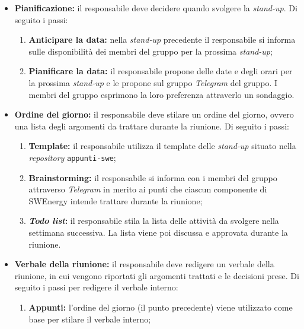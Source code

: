 \begin{itemize}

	\item \textbf{Pianificazione:} il responsabile deve decidere quando
	      svolgere la \textit{stand-up}. Di seguito i passi:
	      \begin{enumerate}
		      \item \textbf{Anticipare la data:} nella \textit{stand-up}
		            precedente il responsabile si informa sulle disponibilità
		            dei membri del gruppo per la prossima \textit{stand-up};

		      \item \textbf{Pianificare la data:} il responsabile propone delle
		            date e degli orari per la prossima \textit{stand-up} e le
		            propone sul gruppo \textit{Telegram} del gruppo. I membri
		            del gruppo esprimono la loro preferenza attraverlo un
		            sondaggio.
	      \end{enumerate}

	\item \textbf{Ordine del giorno:} il responsabile deve stilare un ordine del
	      giorno, ovvero una lista degli argomenti da trattare durante la
	      riunione. Di seguito i passi:
	      \begin{enumerate}
		      \item \textbf{Template:} il responsabile utilizza il template
		            delle \textit{stand-up} situato nella \textit{repository}
		            \texttt{appunti-swe};

		      \item \textbf{Brainstorming:} il responsabile si informa con i
		            membri del gruppo attraverso \textit{Telegram} in merito ai
		            punti che ciascun componente di SWEnergy intende trattare
		            durante la riunione;

		      \item \textbf{\textit{Todo list}:} il responsabile stila la lista
		            delle attività da svolgere nella settimana successiva. La
		            lista viene poi discussa e approvata durante la riunione.
	      \end{enumerate}

	\item \textbf{Verbale della riunione:} il responsabile deve redigere un
	      verbale della riunione, in cui vengono riportati gli argomenti
	      trattati e le decisioni prese. Di seguito i passi per redigere il
	      verbale interno:
	      \begin{enumerate}
		      \item \textbf{Appunti:} l'ordine del giorno (il punto precedente)
		            viene utilizzato come base per stilare il verbale interno;


\end{enumerate}
\end{itemize}
